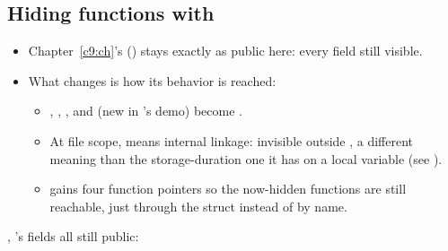\subsection{Hiding functions with }
\label{c10:a:2}
\begin{itemize}
  \item Chapter~\ref{c9:ch}'s  () stays exactly as public here: every
    field still visible.
  \item What changes is how its behavior is reached:
  \begin{itemize}
    \item {}, , , and
       (new in 's demo) become .
    \item At file scope,  means internal linkage: invisible outside , a
      different meaning than the storage-duration one it has on a local variable (see
      ).
    \item {} gains four function pointers so the now-hidden functions are still
      reachable, just through the struct instead of by name.
  \end{itemize}
\end{itemize}

\noindent{}, 's fields all still public:

